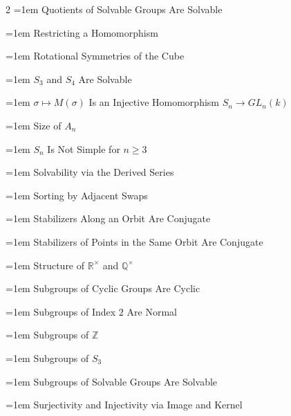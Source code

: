 \documentclass[11pt]{report}
\begin{document}
\begin{multicols}{2}
\noindent\hangindent=1em Quotients of Solvable Groups Are Solvable\dotfill \pageref{prop:quotients-solvable}\par
\noindent\hangindent=1em Restricting a Homomorphism\dotfill \pageref{lem:restricting-homomorphism}\par
\noindent\hangindent=1em Rotational Symmetries of the Cube\dotfill \pageref{prop:rotational-symmetries-cube}\par
\noindent\hangindent=1em $S_3$ and $S_4$ Are Solvable\dotfill \pageref{prop:s3-s4-solvable}\par
\noindent\hangindent=1em $\sigma \mapsto M(\sigma)$ Is an Injective Homomorphism $S_n \to GL_n(k)$\dotfill \pageref{prop:sigma-maps-m-sigma-injective-homomorphism-sn-to}\par
\noindent\hangindent=1em Size of $A_n$\dotfill \pageref{prop:size-an}\par
\noindent\hangindent=1em $S_n$ Is Not Simple for $n \geq 3$\dotfill \pageref{cor:sn-not-simple-n-ge-3}\par
\noindent\hangindent=1em Solvability via the Derived Series\dotfill \pageref{thm:solvable-derived-series}\par
\noindent\hangindent=1em Sorting by Adjacent Swaps\dotfill \pageref{lem:sorting-adjacent-swaps}\par
\noindent\hangindent=1em Stabilizers Along an Orbit Are Conjugate\dotfill \pageref{cor:stabilizers-along-orbit-conjugate}\par
\noindent\hangindent=1em Stabilizers of Points in the Same Orbit Are Conjugate\dotfill \pageref{prop:stabilizers-points-same-orbit-conjugate}\par
\noindent\hangindent=1em Structure of $\mathbb{R}^\times$ and $\mathbb{Q}^\times$\dotfill \pageref{prop:structure-r-x-q-x}\par
\noindent\hangindent=1em Subgroups of Cyclic Groups Are Cyclic\dotfill \pageref{thm:subgroups-cyclic-groups-cyclic}\par
\noindent\hangindent=1em Subgroups of Index $2$ Are Normal\dotfill \pageref{prop:subgroups-index-2-normal}\par
\noindent\hangindent=1em Subgroups of $\mathbb{Z}$\dotfill \pageref{prop:subgroups-z}\par
\noindent\hangindent=1em Subgroups of $S_3$\dotfill \pageref{prop:subgroups-s3}\par
\noindent\hangindent=1em Subgroups of Solvable Groups Are Solvable\dotfill \pageref{prop:subgroups-solvable}\par
\noindent\hangindent=1em Surjectivity and Injectivity via Image and Kernel\dotfill \pageref{prop:surjectivity-injectivity-via-image-kernel}\par

\end{multicols}
\end{document}
